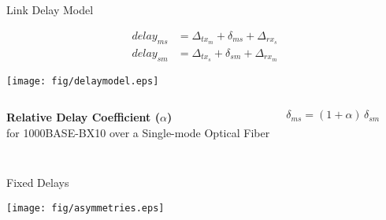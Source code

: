 \documentclass[compress,red]{beamer}
\begin{document}
\subsection{}
\begin{frame}{Link Delay Model}

  \begin{align}
    \nonumber delay_{ms} &= \Delta_{tx_m} + \delta_{ms} + \Delta_{rx_s} \\
    \nonumber delay_{sm} &= \Delta_{tx_s} + \delta_{sm} + \Delta_{rx_m}
  \end{align}

   \vspace{0.2cm}

  \begin{center}
  \texttt{[image: fig/delaymodel.eps]}
  \end{center}

\begin{columns}[c]
  \column{2.8in}

    \begin{center}
      \textbf{Relative Delay Coefficient ($\alpha$)} \\
      for 1000BASE-BX10 over a Single-mode Optical Fiber
    \end{center}

  \column{1.5in}
    \begin{center}
      \begin{equation}
      \nonumber \delta_{ms} = (1 + \alpha) \, \delta_{sm}
      \end{equation}
    \end{center}
    \vspace{0.5cm}
\end{columns}
  
\end{frame}
\subsection{}
\begin{frame}{Fixed Delays}

  \begin{center}
  \texttt{[image: fig/asymmetries.eps]}
  \end{center}

\end{frame}
\end{document}
